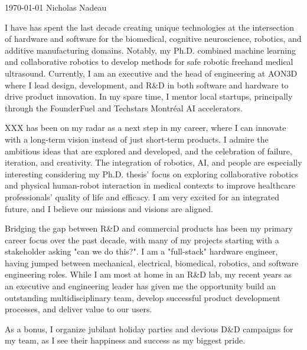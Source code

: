 \documentclass[11pt, letterpaper]{awesome-cv}
\begin{document}
\makecvheader[C]

\makecvfooter
{\today}
{Nicholas Nadeau}
{}

\makelettertitle


\begin{cvletter}


    I have has spent the last decade creating unique technologies at the intersection of hardware and software for the biomedical, cognitive neuroscience, robotics, and additive manufacturing domains.
    Notably, my Ph.D. combined machine learning and collaborative robotics to develop methods for safe robotic freehand medical ultrasound.
    Currently, I am an executive and the head of engineering at AON3D where I lead design, development, and R\&D in both software and hardware to drive product innovation.
    In my spare time, I mentor local startups, principally through the FounderFuel and Techstars Montréal AI accelerators.


    XXX has been on my radar as a next step in my career, where I can innovate with a long-term vision instead of just short-term products.
    I admire the ambitious ideas that are explored and developed, and the celebration of failure, iteration, and creativity.
    The integration of robotics, AI, and people are especially interesting considering my Ph.D. thesis' focus on exploring collaborative robotics and physical human-robot interaction in medical contexts to improve healthcare professionals' quality of life and efficacy.
    I am very excited for an integrated future, and I believe our missions and visions are aligned.


    Bridging the gap between R\&D and commercial products has been my primary career focus over the past decade, with many of my projects starting with a stakeholder asking "can we do this?".
    I am a "full-stack" hardware engineer, having jumped between mechanical, electrical, biomedical, robotics, and software engineering roles.
    While I am most at home in an R\&D lab, my recent years as an executive and engineering leader has given me the opportunity build an outstanding multidisciplinary team, develop successful product development processes, and deliver value to our users.

    As a bonus, I organize jubilant holiday parties and devious D\&D campaigns for my team, as I see their happiness and success as my biggest pride.

\end{cvletter}

\makeletterclosing
\end{document}
